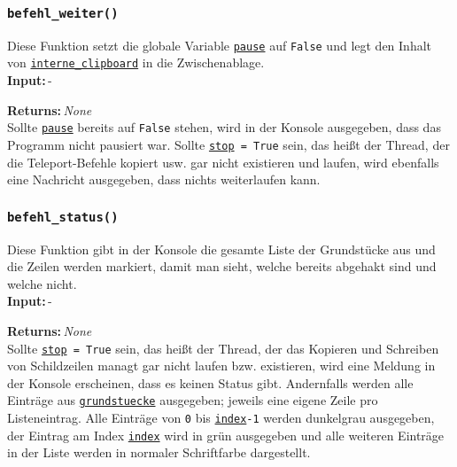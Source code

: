 \documentclass{article}
\newcommand{\bfpara}[1]{\noindent \textbf{#1:}\,}
\begin{document}
\subsubsection*{\texttt{befehl\_weiter()}}
Diese Funktion setzt die globale Variable \hyperref[subsec:globale_variablen]{\texttt{pause}} auf \texttt{False} und legt den Inhalt von \hyperref[subsec:globale_variablen]{\texttt{interne\_clipboard}} in die Zwischenablage.\\

\bfpara{Input}-

\bfpara{Returns}\textit{None}\\

Sollte \hyperref[subsec:globale_variablen]{\texttt{pause}} bereits auf \texttt{False} stehen, wird in der Konsole ausgegeben, dass das Programm nicht pausiert war. Sollte \hyperref[subsec:globale_variablen]{\texttt{stop}}\texttt{ = True} sein, das hei{\ss}t der Thread, der die Teleport-Befehle kopiert usw. gar nicht existieren und laufen, wird ebenfalls eine Nachricht ausgegeben, dass nichts weiterlaufen kann.\\[11pt]

\subsubsection*{\texttt{befehl\_status()}}
Diese Funktion gibt in der Konsole die gesamte Liste der Grundst\"ucke aus und die Zeilen werden markiert, damit man sieht, welche bereits abgehakt sind und welche nicht.\\

\bfpara{Input}-

\bfpara{Returns}\textit{None}\\

Sollte \hyperref[subsec:globale_variablen]{\texttt{stop}}\texttt{ = True} sein, das hei{\ss}t der Thread, der das Kopieren und Schreiben von Schildzeilen managt gar nicht laufen bzw. existieren, wird eine Meldung in der Konsole erscheinen, dass es keinen Status gibt. Andernfalls werden alle Eintr\"age aus \hyperref[subsec:globale_variablen]{\texttt{grundstuecke}} ausgegeben; jeweils eine eigene Zeile pro Listeneintrag. Alle Eintr\"age von \texttt{0} bis \hyperref[subsec:globale_variablen]{\texttt{index}}\texttt{-1} werden dunkelgrau ausgegeben, der Eintrag am Index \hyperref[subsec:globale_variablen]{\texttt{index}} wird in gr\"un ausgegeben und alle weiteren Eintr\"age in der Liste werden in normaler Schriftfarbe dargestellt.\\
\end{document}
